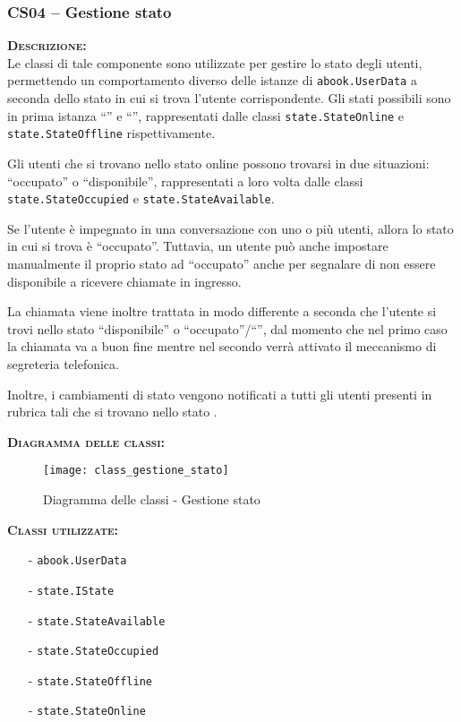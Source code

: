 \subsubsection{CS04 -- Gestione stato}
\begin{description}
	\item{\scshape\bfseries Descrizione:}\\
Le classi di tale componente sono utilizzate per gestire lo stato degli utenti, permettendo un comportamento diverso delle istanze di \texttt{abook.UserData} a seconda dello stato in cui si trova l'utente corrispondente. Gli stati possibili sono in prima istanza ``'' e ``'', rappresentati dalle classi \texttt{state.StateOnline} e \texttt{state.StateOffline} rispettivamente.

Gli utenti che si trovano nello stato online possono trovarsi in due situazioni: ``occupato'' o ``disponibile'', rappresentati a loro volta dalle classi \texttt{state.StateOccupied} e \texttt{state.StateAvailable}.

Se l'utente è impegnato in una conversazione con uno o più utenti, allora lo stato in cui si trova è ``occupato''. Tuttavia, un utente può anche impostare manualmente il proprio stato ad ``occupato'' anche per segnalare di non essere disponibile a ricevere chiamate in ingresso.
	
La chiamata viene inoltre trattata in modo differente a seconda che l'utente si trovi nello stato ``disponibile'' o ``occupato''/``'', dal momento che nel primo caso la chiamata va a buon fine mentre nel secondo verrà attivato il meccanismo di segreteria telefonica.
	
Inoltre, i cambiamenti di stato vengono notificati a tutti gli utenti presenti in rubrica tali che si trovano nello stato .
	\item{\scshape\bfseries Diagramma delle classi:}
\begin{figure}[H]
  \centering
  \texttt{[image: class\_gestione\_stato]}
  \caption{Diagramma delle classi - Gestione stato}\label{fig:gestione_stato}
\end{figure}
	
	\item{\scshape\bfseries Classi utilizzate:}\\ 
	\begin{itemize}[noitemsep,nolistsep]
	  \item[-] \texttt{abook.UserData}
	  \item[-] \texttt{state.IState}
	  \item[-] \texttt{state.StateAvailable}
	  \item[-] \texttt{state.StateOccupied}
	  \item[-] \texttt{state.StateOffline}
	  \item[-] \texttt{state.StateOnline}
	\end{itemize}
\end{description}

